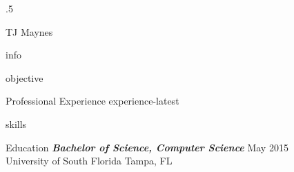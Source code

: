 \documentclass[10pt]{article}
\begin{document}
\moveleft.5\hoffset\centerline{\huge TJ Maynes}
{info}

{objective}

\begin{section}{Professional Experience}
  {experience-latest}
\end{section}

{skills}

\begin{section}{Education}
  {\sl \textbf{Bachelor of Science, Computer Science}} \hfill May 2015  \\
  University of South Florida \hfill Tampa, FL \\
\end{section}
\end{document}
